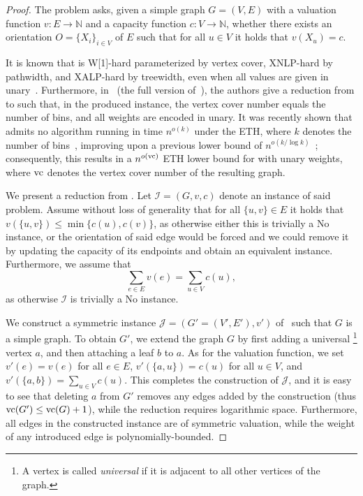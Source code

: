 \begin{proof}
    The {\TOO} problem asks,
    given a simple graph $G=(V,E)$ with a valuation function $v \colon E \to \mathbb{N}$
    and a capacity function $c \colon V \to \mathbb{N}$,
    whether there exists an orientation $O = \{X_i\}_{i \in V}$ of $E$ such that
    for all $u \in V$ it holds that $v(X_u)=c$.

    It is known that {\TOO} is W[1]-hard parameterized by vertex cover,
    XNLP-hard by pathwidth,
    and XALP-hard by treewidth, even when all values are given in unary~\cite{wg/BodlaenderCW22,dam/BodlaenderS26}.
    Furthermore, in~\cite[Theorem~6.4]{arxiv/BodlaenderCW22} (the full version of~\cite{wg/BodlaenderCW22}),
    the authors give a reduction from {\UBP} to {\TOO} such that,
    in the produced instance, the vertex cover number equals the number of bins,
    and all weights are encoded in unary.
    It was recently shown that {\UBP} admits no algorithm running in time $n^{o(k)}$ under the ETH,
    where $k$ denotes the number of bins~\cite{bringmann2026tightsethbasedlowerbounds},
    improving upon a previous lower bound of $n^{o(k/\log k)}$~\cite{jcss/JansenKMS13};
    consequently, this results in a $n^{o(\mathrm{vc})}$ ETH lower bound for {\TOO} with unary weights,
    where $\mathrm{vc}$ denotes the vertex cover number of the resulting graph.

    We present a reduction from {\TOO}.
    Let $\mathcal{I} =  (G,v,c)$ denote an instance of said problem.
    Assume without loss of generality that for all $\{u,v\} \in E$ it holds that $v(\{u,v\}) \le \min\{c(u),c(v)\}$,
    as otherwise either this is trivially a No instance, or the orientation of said edge would be forced and we could remove it
    by updating the capacity of its endpoints and obtain an equivalent instance.
    Furthermore, we assume that
    \begin{equation}\label{eq:w1h-ef}
        \sum_{e \in E} v(e) = \sum_{u \in V} c(u),
    \end{equation}
    as otherwise $\mathcal{I}$ is trivially a No instance.

    We construct a symmetric instance $\mathcal{J} = (G'=(V',E'),v')$ of \EFo\ such that $G$ is a simple graph.
    To obtain $G'$, we extend the graph $G$ by first adding a universal%
    \footnote{A vertex is called \emph{universal} if it is adjacent to all other vertices of the graph.}
    vertex $a$, and then attaching a leaf $b$ to $a$.
    As for the valuation function, we set $v'(e) = v(e)$ for all $e \in E$,
    $v'(\{a,u\})=c(u)$ for all $u \in V$, and $v'(\{a,b\}) = \sum_{u \in V} c(u)$.
    This completes the construction of $\mathcal{J}$,
    and it is easy to see that deleting $a$ from $G'$ removes any edges added by the construction (thus $\mathrm{vc}(G') \le \mathrm{vc}(G) + 1$),
    while the reduction requires logarithmic space.
    Furthermore, all edges in the constructed instance are of symmetric valuation,
    while the weight of any introduced edge is polynomially-bounded.


\end{proof}
